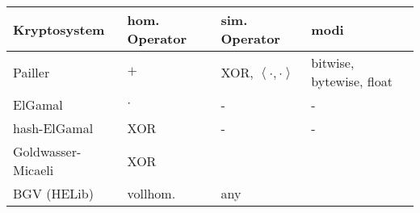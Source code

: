 



\begin{center}
	\begin{tabular}{ | l | l | l | p{5cm} |}
		\hline
		Kryptosystem & hom. Operator & sim. Operator & modi \\ \hline
		Pailler & $+$ & XOR, $\left\langle\cdot,\cdot \right\rangle$  & bitwise, bytewise, float \\ \hline
		ElGamal & $\cdot$ & -  & - \\ \hline
		hash-ElGamal & XOR &  - & - \\ \hline
		Goldwasser-Micaeli & XOR & & \\ \hline
		BGV (HELib) & vollhom. & any& \\ \hline
	\end{tabular}
\end{center}